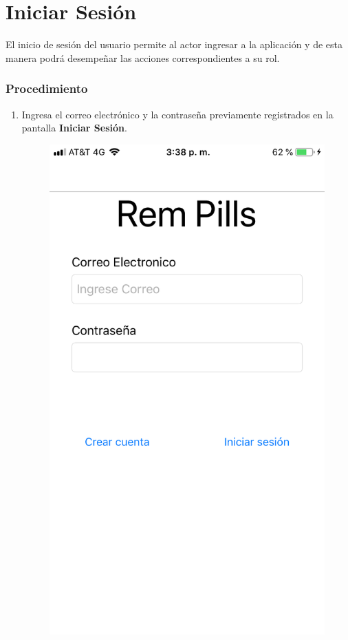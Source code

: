 
\section{Iniciar Sesión}
El inicio de sesión del usuario permite al actor ingresar a la aplicación y de esta manera podrá desempeñar las acciones correspondientes a su rol.

\subsubsection{Procedimiento}
\begin{enumerate}
	
	\item Ingresa el correo electrónico y la contraseña previamente registrados en la pantalla \textbf{Iniciar Sesión}.
	
	\begin{figure}[!htbp]			\hypertarget{fig:IniciarSesion2}{\hspace{1pt}}
		\begin{center}
			\includegraphics[height=0.4\textheight]{Paciente/IniciarSesion/images/IMG-3180}

\end{center}
\end{figure}
\end{enumerate}
